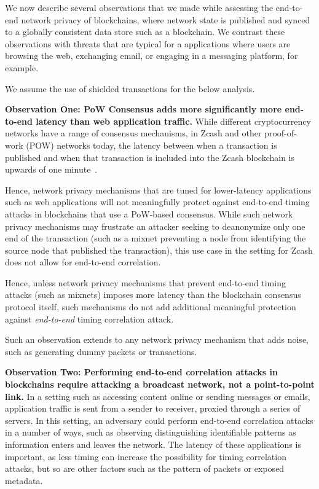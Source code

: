 \documentclass{article}
\begin{document}
We now describe several observations that we made while assessing the
end-to-end network
privacy of blockchains, where network state
is published and synced to a globally consistent data store such as a blockchain. We contrast
these observations with threats that are typical for a applications where users
are browsing the web, exchanging email, or engaging in a messaging platform,
for example.

We assume the use of shielded transactions for the below analysis.

\textbf{Observation One: PoW Consensus adds more significantly more
end-to-end latency than web application traffic.}
While different cryptocurrency networks have a range of consensus mechanisms,
in Zcash and other proof-of-work (POW) networks today, the latency
between when a transaction is published and when that transaction is included
into the Zcash blockchain is upwards of one minute~\cite{zcash-faq}.

Hence, network privacy mechanisms that are tuned for lower-latency applications
such as web applications will not meaningfully protect against end-to-end
timing attacks in blockchains that use a PoW-based consensus. While such
network privacy mechanisms may frustrate an attacker seeking to deanonymize
only one end of the transaction (such as a mixnet preventing a node from
identifying the source node that published the transaction), this use case in
the setting for Zcash does not allow for end-to-end correlation.

Hence, unless network privacy mechanisms that prevent end-to-end timing attacks
(such as mixnets) imposes more latency than the blockchain consensus
protocol itself, such mechanisms do not add additional
meaningful protection against \emph{end-to-end} timing correlation attack.

Such an observation extends to any network privacy mechanism that adds noise,
such as generating dummy packets or transactions.

\textbf{Observation Two: Performing end-to-end correlation attacks in
blockchains require attacking a broadcast network, not a point-to-point link.}
In a setting such as accessing content online or sending messages or emails,
application traffic is sent from a sender to receiver, proxied through a series
of servers. In this setting, an adversary could perform end-to-end correlation
attacks in a number of ways, such as observing distinguishing identifiable
patterns as information enters and leaves the network. The latency of these
applications is important, as less timing can increase the possibility for
timing correlation attacks, but so are other factors such as the pattern of
packets or exposed metadata.
\end{document}
